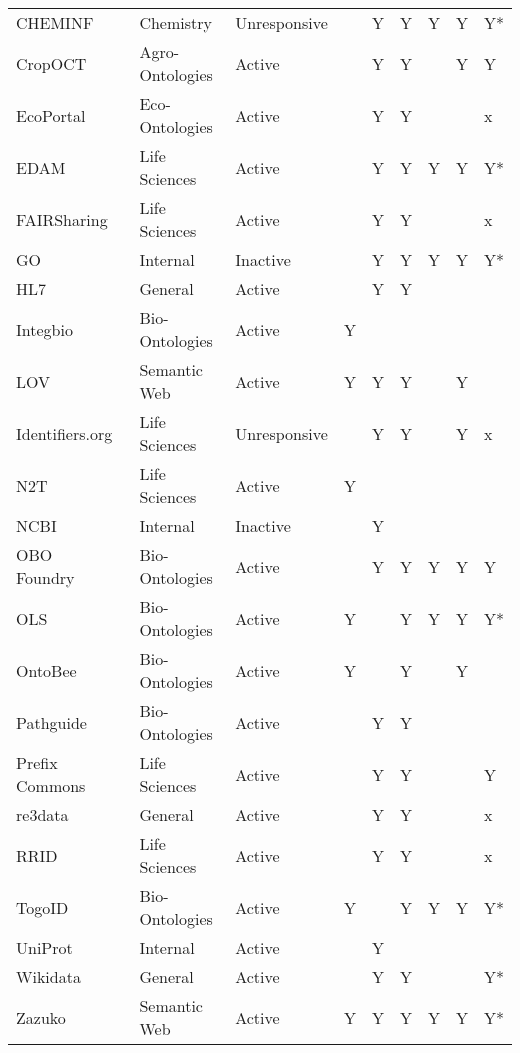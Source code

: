 \begin{table}
\begin{tabular}{lllllllll}
CHEMINF~\cite{Hastings2011} & Chemistry & Unresponsive &  & Y & Y & Y & Y & Y* \\
CropOCT~\cite{Arnaud2020} & Agro-Ontologies & Active &  & Y & Y &  & Y & Y \\
EcoPortal~\cite{Kechagioglou2021} & Eco-Ontologies & Active &  & Y & Y &  &  & x \\
EDAM~\cite{Ison2013} & Life Sciences & Active &  & Y & Y & Y & Y & Y* \\
FAIRSharing~\cite{Sansone2019} & Life Sciences & Active &  & Y & Y &  &  & x \\
GO~\cite{TheGeneOntologyConsortium2019} & Internal & Inactive &  & Y & Y & Y & Y & Y* \\
HL7~\cite{Bender2013} & General & Active &  & Y & Y &  &  &  \\
Integbio & Bio-Ontologies & Active & Y &  &  &  &  &  \\
LOV & Semantic Web & Active & Y & Y & Y &  & Y &  \\
Identifiers.org~\cite{Juty2012} & Life Sciences & Unresponsive &  & Y & Y &  & Y & x \\
N2T~\cite{Wimalaratne2018} & Life Sciences & Active & Y &  &  &  &  &  \\
NCBI~\cite{Clark2016} & Internal & Inactive &  & Y &  &  &  &  \\
OBO Foundry~\cite{Jackson2021} & Bio-Ontologies & Active &  & Y & Y & Y & Y & Y \\
OLS~\cite{Cote2006a} & Bio-Ontologies & Active & Y &  & Y & Y & Y & Y* \\
OntoBee~\cite{Ong2017} & Bio-Ontologies & Active & Y &  & Y &  & Y &  \\
Pathguide & Bio-Ontologies & Active &  & Y & Y &  &  &  \\
Prefix Commons~\cite{prefixcommons} & Life Sciences & Active &  & Y & Y &  &  & Y \\
re3data~\cite{Pampel2013} & General & Active &  & Y & Y &  &  & x \\
RRID & Life Sciences & Active &  & Y & Y &  &  & x \\
TogoID & Bio-Ontologies & Active & Y &  & Y & Y & Y & Y* \\
UniProt~\cite{Bateman2021} & Internal & Active &  & Y &  &  &  &  \\
Wikidata~\cite{Waagmeester2020} & General & Active &  & Y & Y &  &  & Y* \\
Zazuko & Semantic Web & Active & Y & Y & Y & Y & Y & Y* \\
\bottomrule
\end{tabular}
\end{table}
